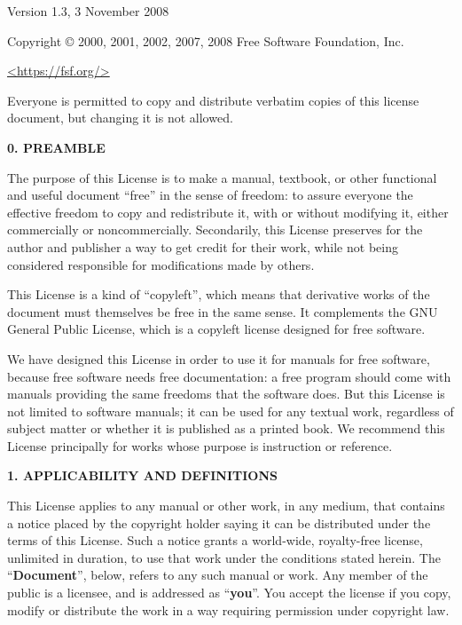 \documentclass{scrbook}
\begin{document}
 \begin{center}

       Version 1.3, 3 November 2008


 Copyright \copyright{} 2000, 2001, 2002, 2007, 2008  Free Software Foundation, Inc.
 
 \bigskip
 
     \url{<https://fsf.org/>}
  
 \bigskip
 
 Everyone is permitted to copy and distribute verbatim copies
 of this license document, but changing it is not allowed.
\end{center}


\begin{center}
{\Large\bfseries 0. PREAMBLE\par}
\end{center}
The purpose of this License is to make a manual, textbook, or other
functional and useful document ``free'' in the sense of freedom: to
assure everyone the effective freedom to copy and redistribute it,
with or without modifying it, either commercially or noncommercially.
Secondarily, this License preserves for the author and publisher a way
to get credit for their work, while not being considered responsible
for modifications made by others.

This License is a kind of ``copyleft'', which means that derivative
works of the document must themselves be free in the same sense.  It
complements the GNU General Public License, which is a copyleft
license designed for free software.

We have designed this License in order to use it for manuals for free
software, because free software needs free documentation: a free
program should come with manuals providing the same freedoms that the
software does.  But this License is not limited to software manuals;
it can be used for any textual work, regardless of subject matter or
whether it is published as a printed book.  We recommend this License
principally for works whose purpose is instruction or reference.


\begin{center}
{\Large\bfseries 1. APPLICABILITY AND DEFINITIONS\par}
\end{center}
This License applies to any manual or other work, in any medium, that
contains a notice placed by the copyright holder saying it can be
distributed under the terms of this License.  Such a notice grants a
world-wide, royalty-free license, unlimited in duration, to use that
work under the conditions stated herein.  The ``\textbf{Document}'', below,
refers to any such manual or work.  Any member of the public is a
licensee, and is addressed as ``\textbf{you}''.  You accept the license if you
copy, modify or distribute the work in a way requiring permission
under copyright law.
\end{document}
